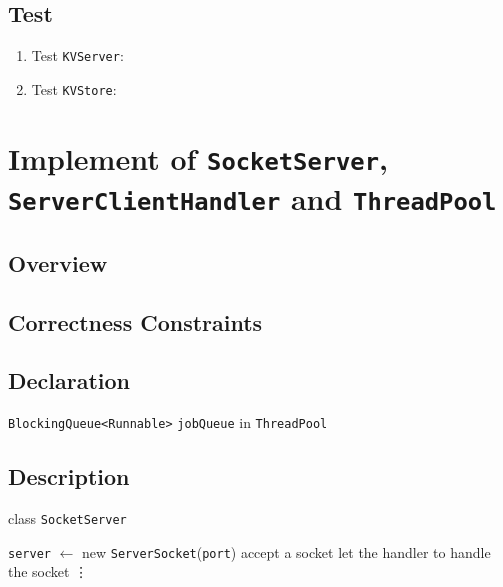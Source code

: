 \documentclass{article}
\begin{document}
\subsection{Test}
\begin{enumerate}
	\item Test \texttt{KVServer}:
	\item Test \texttt{KVStore}:
\end{enumerate}

\section{Implement of \texttt{SocketServer}, \texttt{ServerClientHandler} and \texttt{ThreadPool}}
\subsection{Overview}
\subsection{Correctness Constraints}
\subsection{Declaration}
\begin{compactitem}
	\item \texttt{BlockingQueue<Runnable>} \texttt{jobQueue} in \texttt{ThreadPool}
\end{compactitem}
\subsection{Description}
\begin{algorithm}
    \caption{class \texttt{SocketServer}}
	\begin{algorithmic}
            \State \texttt{server} $\leftarrow$ new \texttt{ServerSocket}(\texttt{port})
        \EndProcedure
                \State accept a socket
                \State let the handler to handle the socket
            \EndWhile
            \State \vdots
        \EndProcedure
	\end{algorithmic}
\end{algorithm}
\end{document}
